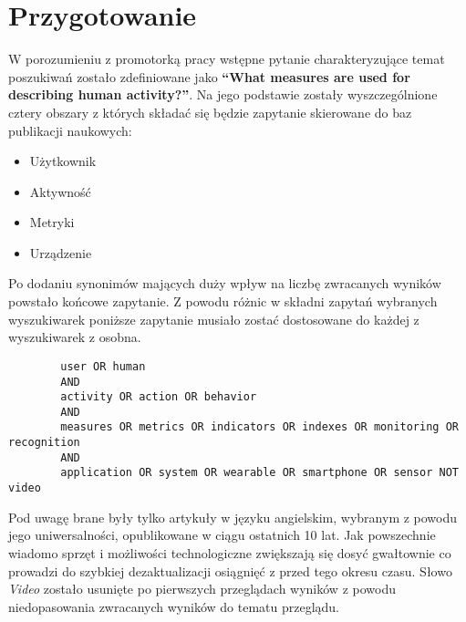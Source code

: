 \section{Przygotowanie}
W porozumieniu z promotorką pracy wstępne pytanie charakteryzujące temat poszukiwań zostało zdefiniowane jako \textbf{``What measures are used for describing human activity?''}. Na jego podstawie zostały wyszczególnione cztery obszary z których składać się będzie zapytanie skierowane do baz publikacji naukowych:
\begin{itemize}
    \item Użytkownik
    \item Aktywność
    \item Metryki
    \item Urządzenie
\end{itemize}

Po dodaniu synonimów mających duży wpływ na liczbę zwracanych wyników powstało końcowe zapytanie. Z powodu różnic w składni zapytań wybranych wyszukiwarek poniższe zapytanie musiało zostać dostosowane do każdej z wyszukiwarek z osobna.
\begin{center}
	\begin{minipage}{0.85\linewidth}
		\begin{verbatim}
		user OR human
		AND
		activity OR action OR behavior
		AND
		measures OR metrics OR indicators OR indexes OR monitoring OR recognition
		AND
		application OR system OR wearable OR smartphone OR sensor NOT video
		\end{verbatim}
	\end{minipage}
\end{center}

Pod uwagę brane były tylko artykuły w języku angielskim, wybranym z powodu jego uniwersalności, opublikowane w ciągu ostatnich 10 lat. Jak powszechnie wiadomo sprzęt i możliwości technologiczne zwiększają się dosyć gwałtownie co prowadzi do szybkiej dezaktualizacji osiągnięć z przed tego okresu czasu. Słowo \textit{Video} zostało usunięte po pierwszych przeglądach wyników z powodu niedopasowania zwracanych wyników do tematu przeglądu.
